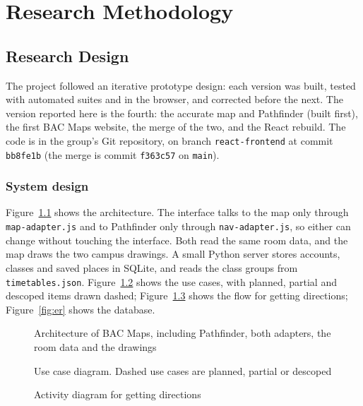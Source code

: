 \documentclass[12pt,a4paper]{report}
\begin{document}
\chapter{Research Methodology}\label{ch:method}

\section{Research Design}
The project followed an iterative prototype design: each version was built, tested with automated suites and in the browser, and corrected before the next. The version reported here is the fourth: the accurate map and Pathfinder (built first), the first BAC Maps website, the merge of the two, and the React rebuild. The code is in the group's Git repository, on branch \texttt{react-frontend} at commit \texttt{bb8fe1b} (the merge is commit \texttt{f363c57} on \texttt{main}).

\subsection{System design}
Figure~\ref{fig:architecture} shows the architecture. The interface talks to the map only through \texttt{map-adapter.js} and to Pathfinder only through \texttt{nav-adapter.js}, so either can change without touching the interface. Both read the same room data, and the map draws the two campus drawings. A small Python server stores accounts, classes and saved places in SQLite, and reads the class groups from \texttt{timetables.json}. Figure~\ref{fig:usecase} shows the use cases, with planned, partial and descoped items drawn dashed; Figure~\ref{fig:activity} shows the flow for getting directions; Figure~\ref{fig:er} shows the database.

\begin{figure}[htbp]
\centering
\resizebox{\textwidth}{!}{}
\caption{Architecture of BAC Maps, including Pathfinder, both adapters, the room data and the drawings}\label{fig:architecture}
\end{figure}

\begin{figure}[htbp]
\centering
\resizebox{0.95\textwidth}{!}{}
\caption{Use case diagram. Dashed use cases are planned, partial or descoped}\label{fig:usecase}
\end{figure}

\begin{figure}[htbp]
\centering
\resizebox{0.8\textwidth}{!}{}
\caption{Activity diagram for getting directions}\label{fig:activity}
\end{figure}
\end{document}
